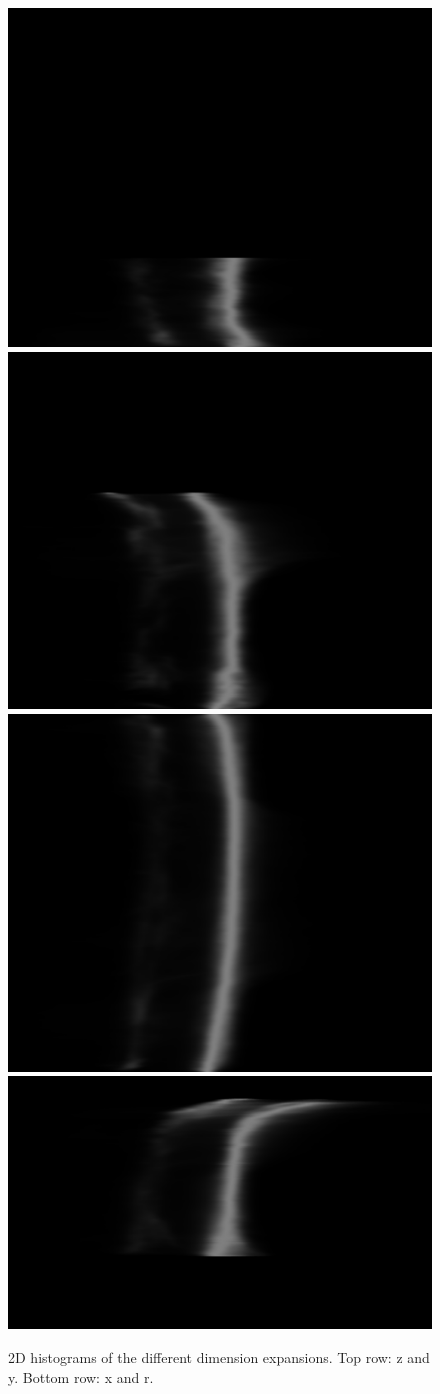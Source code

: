 \begin{figure}
    \centering
    \includegraphics[width=.49\linewidth]{figures/zb-bone_region3.png}
    \includegraphics[width=.49\linewidth]{figures/yb-bone_region3.png}
    \includegraphics[width=.49\linewidth]{figures/xb-bone_region3.png}
    \includegraphics[width=.49\linewidth]{figures/rb-bone_region3.png}
    \caption{2D histograms of the different dimension expansions. Top row: z and y. Bottom row: x and r. }
    \label{fig:2dhists}
\end{figure}

